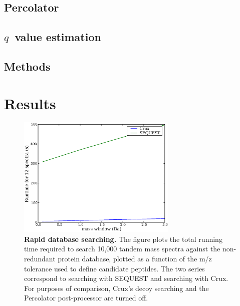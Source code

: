 \documentclass{bioinfo}
\begin{document}
\subsection{Percolator}

\subsection{$q$~value estimation}

\begin{methods}
\section{Methods}

\end{methods}

\section{Results}

\begin{figure}
  \centering
  \includegraphics[width=3in]{./Images/indexing.eps}
  \caption{{\bf Rapid database searching.}  The figure plots the total
  running time required to search 10,000 tandem mass spectra against
  the non-redundant protein database, plotted as a function of the m/z
  tolerance used to define candidate peptides.  The two series
  correspond to searching with SEQUEST and searching with Crux.  For
  purposes of comparison, Crux's decoy searching and the Percolator
  post-processor are turned off.
  \label{figure:indexing}}
\end{figure}
\end{document}
